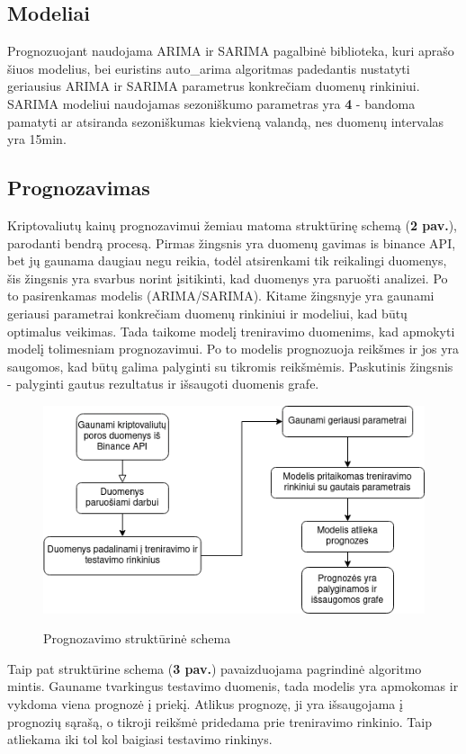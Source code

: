 \documentclass{VUMIFInfKursinis}
\begin{document}
\subsection{Modeliai}
Prognozuojant naudojama ARIMA ir SARIMA pagalbinė biblioteka\cite{seabold2010statsmodels}, kuri aprašo šiuos modelius, 
bei euristins auto\_arima algoritmas\cite{pmdarima} padedantis nustatyti geriausius ARIMA ir SARIMA parametrus konkrečiam duomenų rinkiniui.
SARIMA modeliui naudojamas sezoniškumo parametras yra \textbf{4} - bandoma pamatyti ar atsiranda sezoniškumas kiekvieną valandą, nes duomenų intervalas yra 15min.

\subsection{Prognozavimas}

Kriptovaliutų kainų prognozavimui žemiau matoma struktūrinę schemą (\textbf{2 pav.}), parodanti bendrą procesą. 
Pirmas žingsnis yra duomenų gavimas is binance API, bet jų gaunama daugiau negu reikia, todėl atsirenkami tik reikalingi duomenys, šis žingsnis yra
svarbus norint įsitikinti, kad duomenys yra paruošti analizei. Po to pasirenkamas modelis (ARIMA/SARIMA).
Kitame žingsnyje yra gaunami geriausi parametrai konkrečiam duomenų rinkiniui ir modeliui, kad būtų optimalus veikimas. 
Tada taikome modelį treniravimo duomenims, kad apmokyti modelį tolimesniam prognozavimui. 
Po to modelis prognozuoja reikšmes ir jos yra saugomos, kad būtų galima palyginti su tikromis reikšmėmis. Paskutinis žingsnis - palyginti gautus rezultatus
ir išsaugoti duomenis grafe.

\begin{figure}[H]
  \centering
  \includegraphics[width=.5\textwidth]{img/flowchart.png}
  \label{fig:forecast_flowchart}
  \caption{Prognozavimo struktūrinė schema}
\end{figure}

Taip pat struktūrine schema (\textbf{3 pav.}) pavaizduojama pagrindinė algoritmo mintis. Gauname tvarkingus testavimo duomenis, tada modelis yra apmokomas ir vykdoma viena prognozė į priekį.
Atlikus prognozę, ji yra išsaugojama į prognozių sąrašą, o tikroji reikšmė pridedama prie treniravimo rinkinio. Taip atliekama iki tol kol baigiasi testavimo rinkinys.
\end{document}
